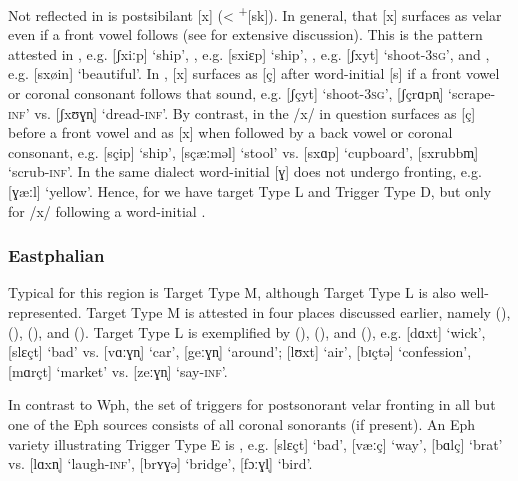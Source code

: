 Not reflected in  is postsibilant [x] (< \textsuperscript{+}[sk]). In general, that [x] surfaces as velar even if a front vowel follows (see \citealt{Hall2021} for extensive discussion). This is the pattern attested in , e.g. [ʃxiːp] ‘ship’, , e.g. [sxiɛp] ‘ship’, , e.g. [ʃxyt] ‘shoot-\textsc{3sg}’, and , e.g. [sxøin] ‘beautiful’. In , [x] surfaces as [ç] after word-initial [s] if a front vowel or coronal consonant follows that sound, e.g. [ʃçyt] ‘shoot-\textsc{3sg}’, [ʃçrɑpn̩] ‘scrape\textsc{{}-inf}’ vs. [ʃxʊɣn̩] ‘dread\textsc{{}-inf}’. By contrast, in  the /x/ in question surfaces as [ç] before a front vowel and as [x] when followed by a back vowel or coronal consonant, e.g. [sçip] ‘ship’, [sçæːməl] ‘stool’ vs. [sxɑp] ‘cupboard’, [sxrubbm̩] ‘scrub\textsc{{}-inf}’. In the same dialect word-initial [ɣ] does not undergo fronting, e.g. [ɣæːl] ‘yellow’. Hence, for  we have target Type L and Trigger Type D, but only for /x/ following a word-initial .

\subsubsection{Eastphalian}\largerpage
Typical for this region is Target Type M, although Target Type L is also well-represented. Target Type M is attested in four places discussed earlier, namely  (),  (),  (), and  (). Target Type L is exemplified by  (),  (), and  (), e.g.  [dɑxt] ‘wick’, [slɛçt] ‘bad’ vs. [vɑːɣn̩] ‘car’, [geːɣn̩] ‘around’;  [lʊxt] ‘air’, [bɪçtə] ‘confession’, [mɑrçt] ‘market’ vs. [zeːɣn̩] ‘say{}-\textsc{inf}’.

In contrast to Wph, the set of triggers for postsonorant velar fronting in all but one of the Eph sources consists of all coronal sonorants (if present). An Eph variety illustrating Trigger Type E is , e.g. [slɛçt] ‘bad’, [væːç] ‘way’, [bɑlç] ‘brat’ vs. [lɑxn̩] ‘laugh-\textsc{inf}’, [brʏɣə] ‘bridge’, [fɔːɣl̩] ‘bird’.

